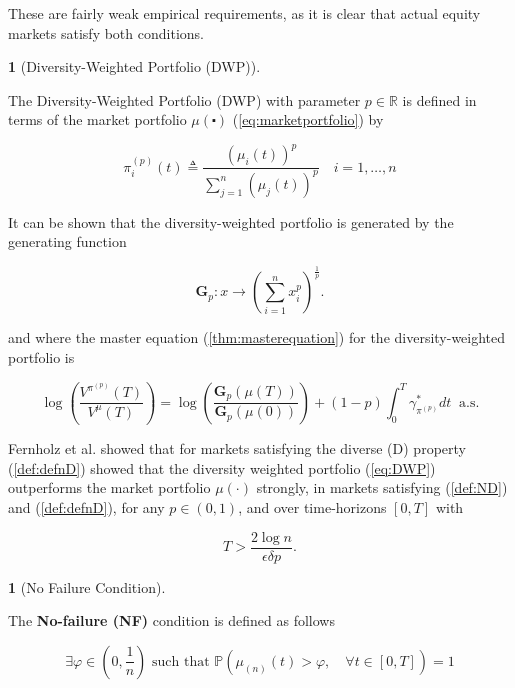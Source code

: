 \documentclass[british]{amsart}
\numberwithin{equation}{section}
\numberwithin{figure}{section}
\theoremstyle{plain}
\theoremstyle{definition}
\newtheorem{defn}[thm]{\protect\definitionname}
\theoremstyle{plain}
\theoremstyle{plain}
\theoremstyle{plain}
\theoremstyle{remark}
\theoremstyle{plain}
\providecommand{\definitionname}{Definition}
\newcommand{\rangei}{i=1,\dots,n}
\newcommand{\measure}{\mathbb{P}}
\begin{document}
These are fairly weak empirical requirements, as it is clear that actual equity markets satisfy both conditions.

\begin{defn} [Diversity-Weighted Portfolio (DWP)] 
	\label{defn:diversityweightedportfolio}

	The Diversity-Weighted Portfolio (DWP) with parameter $p\in\mathbb{R}$ is defined in terms of the market portfolio $\mu(\centerdot)$ (\ref{eq:marketportfolio}) by

	\begin{equation}
		\label{eq:diversityweightedportfolio}
		\pi_{i}^{(p)}(t) \triangleq 
				\frac{\left( \mu_{i}(t) \right)^{p}} {\sum_{j=1}^{n} \left( \mu_{j}(t) \right)^{p} }
		\quad \rangei
	\end{equation}
\end{defn}

It can be shown that the diversity-weighted portfolio is generated by the generating function

	\begin{equation}
		\mathbf{G}_{p}:x\to\left(\sum_{i=1}^{n}x_{i}^{p}\right)^{\frac{1}{p}}.
	\end{equation}

and where the master equation (\ref{thm:masterequation}) for the diversity-weighted portfolio is

	\begin{equation}
		\log\left(\frac{V^{\pi^{(p)}}(T)}{V^{\mu}(T)}\right)=\log\left(\frac{\mathbf{G}_{p}(\mu(T))}{\mathbf{G}_{p}(\mu(0))}\right)+(1-p)\int_{0}^{T}\gamma_{\pi^{(p)}}^{*}dt\;\;\text{a.s.}
	\end{equation}

Fernholz et al. \cite{Fernholz2005a} showed that for markets satisfying the diverse (D) property (\ref{def:defnD}) showed that the diversity weighted portfolio (\ref{eq:DWP}) outperforms the market portfolio $\mu(\cdot)$ strongly, in markets satisfying (\ref{def:ND}) and (\ref{def:defnD}), for any $p\in(0,1)$, and over time-horizons $[0,T]$ with 

\begin{equation}
	T>\frac{2\log n}{\epsilon\delta p}.
\end{equation}

\begin{defn} [No Failure Condition]
	\label{def:NF}

The \textbf{No-failure (NF) }condition is defined as follows

	\begin{equation}
		\exists\varphi\in(0,\frac{1}{n}) \text{ such that }
			\measure \left( \mu_{(n)}(t) > \varphi, \quad \forall t\in[0,T] \right) = 1
	\end{equation}

\end{defn}
\end{document}
